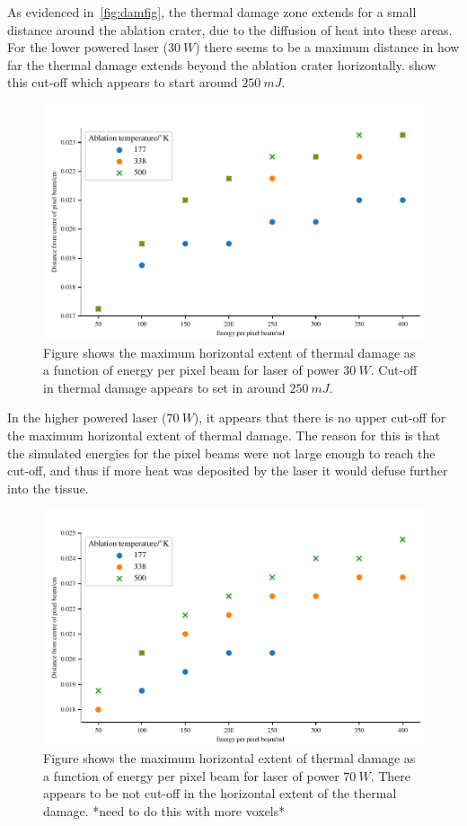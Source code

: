 As evidenced in~\cref{fig:damfig}, the thermal damage zone extends for a small distance around the ablation crater, due to the diffusion of heat into these areas. For the lower powered laser ($30~W$) there seems to be a maximum distance in how far the thermal damage extends beyond the ablation crater horizontally.  show this cut-off which appears to start around $250~mJ$.  
	
\begin{figure}[!h]
	\centering
	\includegraphics[width=\columnwidth]{./ablation/images/horz-30w.pdf}
	\caption{Figure shows the maximum horizontal extent of thermal damage as a function of energy per pixel beam for laser of power $30~W$. Cut-off in thermal damage appears to set in around $250~mJ$.}
	\label{fig:horz-30}
\end{figure}

In the higher powered laser ($70~W$), it appears that there is no upper cut-off for the maximum horizontal extent of thermal damage. The reason for this is that the simulated energies for the pixel beams were not large enough to reach the cut-off, and thus if more heat was deposited by the laser it would defuse further into the tissue.

\begin{figure}[!h]
	\centering
	\includegraphics[width=\columnwidth]{./ablation/images/horz-70w.pdf}
	\caption{Figure shows the maximum horizontal extent of thermal damage as a function of energy per pixel beam for laser of power $70~W$. There appears to be not cut-off in the horizontal extent of the thermal damage. *need to do this with more voxels*}
	\label{fig:horz-70}
\end{figure}

